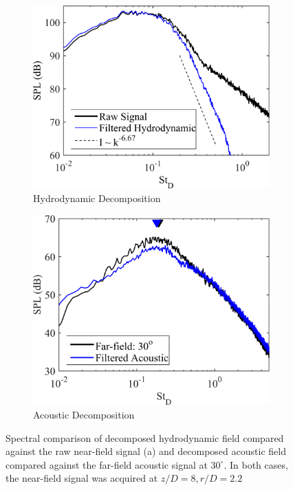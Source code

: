 \begin{figure}
	\centering
	\begin{subfigure}{.5\textwidth}
		\centering
		\includegraphics[width=0.95\linewidth]{Figures/ch3_validation_spectra_hydrodynamic}
		\caption{Hydrodynamic Decomposition}
		\label{fig:ch3_validation_spectra_hydro}
	\end{subfigure}%
	\begin{subfigure}{.5\textwidth}
		\centering
		\includegraphics[width=0.95\linewidth]{Figures/ch3_validation_spectra_acoustic}
		\caption{Acoustic Decomposition}
		\label{fig:ch3_validation_spectra_acoustic}
	\end{subfigure}
	\caption{Spectral comparison of decomposed hydrodynamic field compared against the raw near-field signal (a) and decomposed acoustic field compared against the far-field acoustic signal at $30^\circ$. In both cases, the near-field signal was acquired at $z/D = 8, r/D = 2.2$}
	\label{fig:ch3_validation_spectra}
\end{figure}

